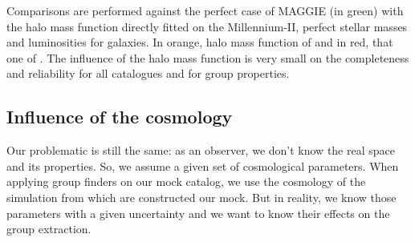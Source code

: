 Comparisons are performed against the perfect case of MAGGIE (in green) with
the halo mass function directly fitted on the Millennium-II, perfect stellar
masses and luminosities for galaxies. In orange, halo mass function of
\citet{Warren+06} and in red, that one of \citet{Courtin+11}. The influence of
the halo mass function is very small on the completeness and reliability for
all catalogues and for group properties.

\subsection{Influence of the cosmology}

Our problematic is still the same: as an observer, we don't know the real space
and its properties. So, we assume a given set of cosmological parameters. When
applying group finders on our mock catalog, we use the cosmology of the
simulation from which are constructed our mock. But in reality, we know those
parameters with a given uncertainty and we want to know their effects on the
group extraction.

